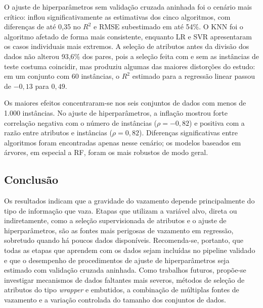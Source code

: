 \begin{otherlanguage}{brazilian}
O ajuste de hiperparâmetros sem validação cruzada aninhada foi o cenário mais
crítico: inflou significativamente as estimativas dos cinco algoritmos, com
diferenças de até 0,35 no $R^2$ e RMSE subestimado em até 54\%. O KNN foi o
algoritmo afetado de forma mais consistente, enquanto LR e SVR apresentaram os
casos individuais mais extremos. A seleção de atributos antes da divisão dos
dados não alterou 93,6\% dos pares, pois a seleção feita com e sem as instâncias
de teste costuma coincidir, mas produziu algumas das maiores distorções do
estudo: em um conjunto com 60 instâncias, o $R^2$ estimado para a regressão
linear passou de $-0{,}13$ para $0{,}49$.

Os maiores efeitos concentraram-se nos seis conjuntos de dados com menos de 1.000
instâncias. No ajuste de hiperparâmetros, a inflação mostrou forte correlação
negativa com o número de instâncias ($\rho = -0{,}82$) e positiva com a razão
entre atributos e instâncias ($\rho = 0{,}82$). Diferenças significativas entre
algoritmos foram encontradas apenas nesse cenário; os modelos baseados em
árvores, em especial a RF, foram os mais robustos de modo geral.

\subsection*{Conclusão}

Os resultados indicam que a gravidade do vazamento depende principalmente do tipo
de informação que vaza. Etapas que utilizam a variável alvo, direta ou
indiretamente, como a seleção supervisionada de atributos e o ajuste de
hiperparâmetros, são as fontes mais perigosas de vazamento em regressão, sobretudo
quando há poucos dados disponíveis. Recomenda-se, portanto, que todas as etapas
que aprendem com os dados sejam incluídas no pipeline validado e que o desempenho
de procedimentos de ajuste de hiperparâmetros seja estimado com validação cruzada
aninhada. Como trabalhos futuros, propõe-se investigar mecanismos de dados
faltantes mais severos, métodos de seleção de atributos do tipo \emph{wrapper} e
embutidos, a combinação de múltiplas fontes de vazamento e a variação controlada
do tamanho dos conjuntos de dados.

\end{otherlanguage}
